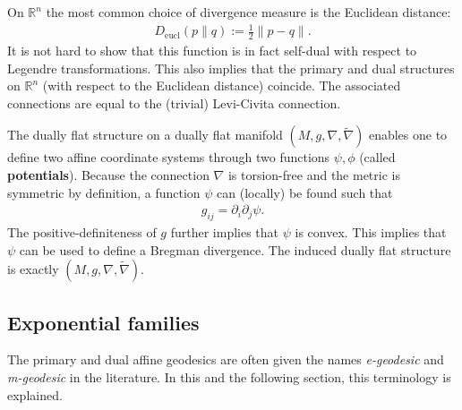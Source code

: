     \begin{example}
        On $\mathbb{R}^n$ the most common choice of divergence measure is the Euclidean distance:
        \begin{gather}
            D_\mathrm{eucl}(p\|q) := \frac{1}{2}\|p-q\|.
        \end{gather}
        It is not hard to show that this function is in fact self-dual with respect to Legendre transformations. This also implies that the primary and dual structures on $\mathbb{R}^n$ (with respect to the Euclidean distance) coincide. The associated connections are equal to the (trivial) Levi-Civita connection.
    \end{example}

    \begin{property}
        The dually flat structure on a dually flat manifold $(M,g,\nabla,\widetilde{\nabla})$ enables one to define two affine coordinate systems through two functions $\psi,\phi$ (called \textbf{potentials}). Because the connection $\nabla$ is torsion-free and the metric is symmetric by definition, a function $\psi$ can (locally) be found such that
        \begin{gather}
            g_{ij} = \partial_i\partial_j\psi.
        \end{gather}
        The positive-definiteness of $g$ further implies that $\psi$ is convex. This implies that $\psi$ can be used to define a Bregman divergence. The induced dually flat structure is exactly $(M,g,\nabla,\widetilde{\nabla})$.
    \end{property}

\subsection{Exponential families}

    The primary and dual affine geodesics are often given the names \textit{e-geodesic} and \textit{m-geodesic} in the literature. In this and the following section, this terminology is explained.

